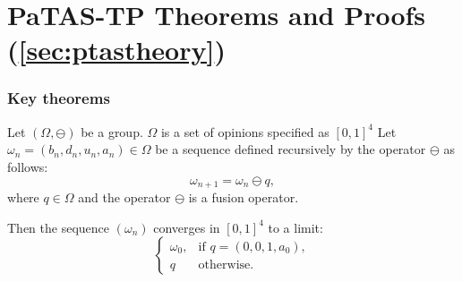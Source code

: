 
\chapter{\ac{PaTAS-TP} Theorems and Proofs (\cref{sec:ptastheory})}\label{app:proof}
\subsection{Key theorems}
\begin{theorem}\label{thm:arithm}
Let $(\Omega, \ominus)$ be a group. \(\Omega\) is a set of opinions specified as \([0,1]^4\)
Let $\omega_n = (b_n, d_n, u_n, a_n) \in \Omega$ be a sequence defined recursively by the operator $\ominus$ as follows:
\[
\omega_{n+1} = \omega_n \ominus q,
\]
where \(q\in \Omega\) and the operator $\ominus$ is a fusion operator.

Then the sequence $(\omega_n)$ converges in $[0,1]^4$ to a limit:
\[
\begin{cases}
\omega_0, & \text{if } q = (0, 0, 1, a_0), \\
q & \text{otherwise}.
\end{cases}
\]

\end{theorem}

